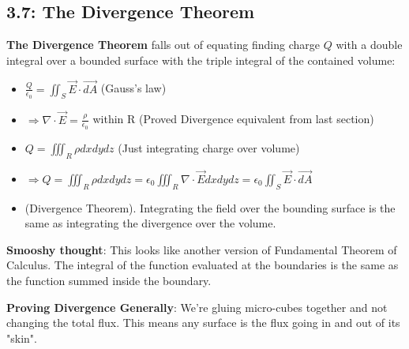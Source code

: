 \documentclass[11pt, oneside]{article}   	%
\begin{document}
\subsection{3.7:  The Divergence Theorem}

\textbf{The Divergence Theorem} falls out of equating finding charge $Q$ with a double integral over a bounded surface with the triple integral of the contained volume:
\begin{itemize}
\item $\frac{Q}{\epsilon_0} = \iint_S \vec{E} \cdot \vec{dA}$ (Gauss's law)
\item $\Rightarrow \nabla \cdot \vec{E} = \frac{\rho}{\epsilon_0}$ within R (Proved Divergence equivalent from last section)
\item $Q = \iiint_R \rho dx dy dz$ (Just integrating charge over volume)
\item $\Rightarrow Q = \iiint_R \rho dx dy dz = \epsilon_0  \iiint_R \nabla \cdot \vec{E} dx dy dz = \epsilon_0 \iint_S \vec{E} \cdot \vec{dA}$ 
\item {} (Divergence Theorem).  Integrating the field over the bounding surface is the same as integrating the divergence over the volume.
\end{itemize}


\textbf{Smooshy thought}: This looks like another version of Fundamental Theorem of Calculus.  The integral of the function evaluated at the boundaries is the same as the function summed inside the boundary.


\textbf{Proving Divergence Generally}: We're gluing micro-cubes together and not changing the total flux.  This means any surface is the flux going in and out of its "skin".
\end{document}
